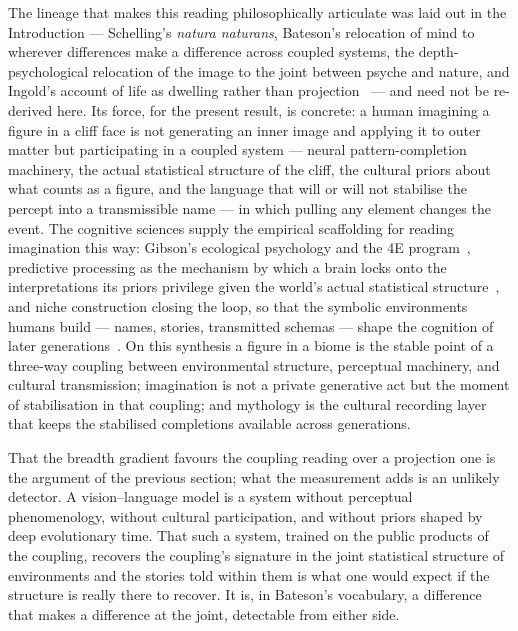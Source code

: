 \documentclass[11pt,a4paper]{article}
\begin{document}
The lineage that makes this reading philosophically articulate was
laid out in the Introduction --- Schelling's \emph{natura naturans},
Bateson's relocation of mind to wherever differences make a
difference across coupled systems, the depth-psychological relocation
of the image to the joint between psyche and nature, and Ingold's
account of life as dwelling rather than
projection~\citep{schelling1797ideas,schelling1799outline,bateson1972steps,bateson1979mind,jung1959archetypes,hillman1975revisioning,hillman1981thought,corbin1972mundus,abram1996spell,ingold2000perception,descola2013beyond}
--- and need not be re-derived here. Its force, for the present
result, is concrete: a human imagining a figure in a cliff face is
not generating an inner image and applying it to outer matter but
participating in a coupled system --- neural pattern-completion
machinery, the actual statistical structure of the cliff, the
cultural priors about what counts as a figure, and the language that
will or will not stabilise the percept into a transmissible name ---
in which pulling any element changes the event. The cognitive
sciences supply the empirical scaffolding for reading imagination
this way: Gibson's ecological psychology and the 4E
program~\citep{gibson1979ecological,varela1991embodied,clark1998extended,noe2004action},
predictive processing as the mechanism by which a brain locks onto
the interpretations its priors privilege given the world's actual
statistical structure~\citep{friston2010free,clark2016surfing,hohwy2013predictive},
and niche construction closing the loop, so that the symbolic
environments humans build --- names, stories, transmitted schemas ---
shape the cognition of later
generations~\citep{odlingsmee2003niche}. On this synthesis a figure
in a biome is the stable point of a three-way coupling between
environmental structure, perceptual machinery, and cultural
transmission; imagination is not a private generative act but the
moment of stabilisation in that coupling; and mythology is the
cultural recording layer that keeps the stabilised completions
available across generations.

That the breadth gradient favours the coupling reading over a
projection one is the argument of the previous section; what the
measurement adds is an unlikely detector. A vision--language model is
a system without perceptual phenomenology, without cultural
participation, and without priors shaped by deep evolutionary time. That such a system,
trained on the public products of the coupling, recovers the
coupling's signature in the joint statistical structure of
environments and the stories told within them is what one would
expect if the structure is really there to recover. It is, in
Bateson's vocabulary, a difference that makes a difference at
the joint, detectable from either side.
\end{document}
